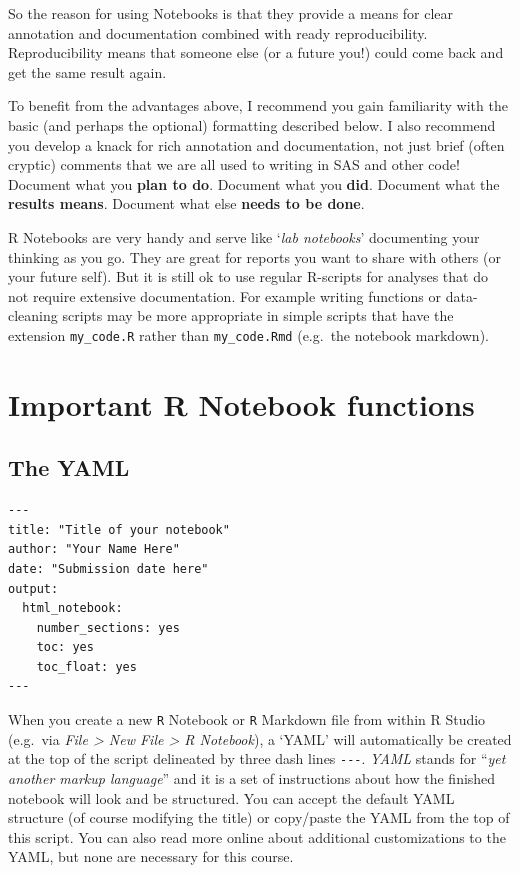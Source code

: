 \documentclass[
]{book}
\newenvironment{rmdtip}[1]
  {
  \begin{itemize}
  \renewcommand{\labelitemi}{
    \raisebox{-.7\height}[0pt][0pt]{
      {\setkeys{Gin}{width=3em,keepaspectratio}\texttt{[image: images/\#1]}}
    }
  }
  \setlength{\fboxsep}{1em}
  \begin{tip}
  \item
  }
  {
  \end{tip}
  \end{itemize}
  }
\begin{document}
So the reason for using Notebooks is that they provide a means for clear annotation and documentation combined with ready reproducibility. Reproducibility means that someone else (or a future you!) could come back and get the same result again.

To benefit from the advantages above, I recommend you gain familiarity with the basic (and perhaps the optional) formatting described below. I also recommend you develop a knack for rich annotation and documentation, not just brief (often cryptic) comments that we are all used to writing in SAS and other code! Document what you \textbf{plan to do}. Document what you \textbf{did}. Document what the \textbf{results means}. Document what else \textbf{needs to be done}.

\begin{rmdtip}{tip}
R Notebooks are very handy and serve like `\emph{lab notebooks}' documenting your thinking as you go. They are great for reports you want to share with others (or your future self). But it is still ok to use regular R-scripts for analyses that do not require extensive documentation. For example writing functions or data-cleaning scripts may be more appropriate in simple scripts that have the extension \texttt{my\_code.R} rather than \texttt{my\_code.Rmd} (e.g.~the notebook markdown).

\end{rmdtip}

\hypertarget{important-r-notebook-functions}{%
\section{Important R Notebook functions}\label{important-r-notebook-functions}}

\hypertarget{the-yaml}{%
\subsection{The YAML}\label{the-yaml}}

\begin{verbatim}
---
title: "Title of your notebook"
author: "Your Name Here"
date: "Submission date here"
output:
  html_notebook:
    number_sections: yes
    toc: yes
    toc_float: yes
---
\end{verbatim}

When you create a new \texttt{R} Notebook or \texttt{R} Markdown file from within R Studio (e.g.~via \emph{File \textgreater{} New File \textgreater{} R Notebook}), a `YAML' will automatically be created at the top of the script delineated by three dash lines \texttt{-\/-\/-}. \emph{YAML} stands for ``\emph{yet another markup language}'' and it is a set of instructions about how the finished notebook will look and be structured. You can accept the default YAML structure (of course modifying the title) or copy/paste the YAML from the top of this script. You can also read more online about additional customizations to the YAML, but none are necessary for this course.
\end{document}
